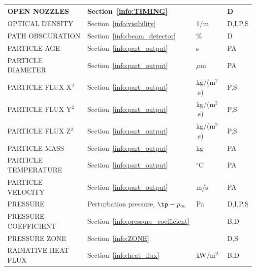 \documentclass[11pt]{book}
\begin{document}
\begin{longtable}{@{\extracolsep{\fill}}|l|l|l|l|}
{\ct OPEN NOZZLES}                              & Section~\ref{info:TIMING}                     &                & D            \\ \hline
{\ct OPTICAL DENSITY}                           & Section~\ref{info:visibility}                 & 1/m            & D,I,P,S      \\ \hline
{\ct PATH OBSCURATION}                          & Section~\ref{info:beam_detector}              & \%             & D            \\ \hline
{\ct PARTICLE AGE}                              & Section~\ref{info:part_output}                & s              & PA           \\ \hline
{\ct PARTICLE DIAMETER}                         & Section~\ref{info:part_output}                & $\mu$m         & PA           \\ \hline
{\ct PARTICLE FLUX X}$^2$                       & Section~\ref{info:part_output}                & \si{kg/(m$^2$.s)} & P,S       \\ \hline
{\ct PARTICLE FLUX Y}$^2$                       & Section~\ref{info:part_output}                & \si{kg/(m$^2$.s)} & P,S       \\ \hline
{\ct PARTICLE FLUX Z}$^2$                       & Section~\ref{info:part_output}                & \si{kg/(m$^2$.s)} & P,S       \\ \hline
{\ct PARTICLE MASS}                             & Section~\ref{info:part_output}                & kg             & PA           \\ \hline
{\ct PARTICLE TEMPERATURE}                      & Section~\ref{info:part_output}                & $^\circ$C      & PA           \\ \hline
{\ct PARTICLE VELOCITY}                         & Section~\ref{info:part_output}                & m/s            & PA           \\ \hline
{\ct PRESSURE}                                  & Perturbation pressure, $\tp-p_\infty$         & Pa             & D,I,P,S      \\ \hline
{\ct PRESSURE COEFFICIENT}                      & Section~\ref{info:pressure_coefficient}       &                & B,D          \\ \hline
{\ct PRESSURE ZONE}                             & Section~\ref{info:ZONE}                       &                & D,S          \\ \hline
{\ct RADIATIVE HEAT FLUX}                       & Section~\ref{info:heat_flux}                  & kW/m$^2$       & B,D          \\ \hline

\end{longtable}
\end{document}
